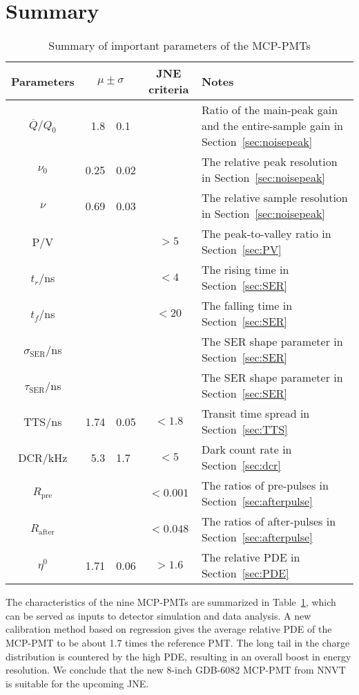 \section{Summary}
\label{Summary}
\begin{table}
    \centering
    \caption{Summary of important parameters of the MCP-PMTs}
    \label{tab:summary}
    \begin{tabularx}{\textwidth}{c|r @{$\pm$} l |c|X}
        \hline
        Parameters&\multicolumn{2}{c}{$\mu\pm\sigma$}\vline&JNE criteria&Notes\\
        \hline
        $\overline{Q}/Q_0$&1.8&0.1&&Ratio of the main-peak gain and the entire-sample gain in Section~\ref{sec:noisepeak}\\
        $\nu_0$&0.25&0.02&&The relative peak resolution in Section~\ref{sec:noisepeak}\\
        $\nu$&0.69&0.03&&The relative sample resolution in Section~\ref{sec:noisepeak}\\
        P/V&&&$>5$&The peak-to-valley ratio in Section~\ref{sec:PV}\\
        $t_r$/ns&&&$<4$&The rising time in Section~\ref{sec:SER}\\
        $t_f$/ns&&&$<20$&The falling time in Section~\ref{sec:SER}\\
        $\sigma_{\mathrm{SER}}$/ns&&&&The SER shape parameter in Section~\ref{sec:SER}\\
        $\tau_{\mathrm{SER}}$/ns&&&&The SER shape parameter in Section~\ref{sec:SER}\\
        TTS/ns&1.74&0.05&$<1.8$&Transit time spread in Section~\ref{sec:TTS}\\
        DCR/kHz&5.3&1.7&$<5$&Dark count rate in Section~\ref{sec:dcr}\\
        $R_{\mathrm{pre}}$&&&$<0.001$&The ratios of pre-pulses in Section~\ref{sec:afterpulse}\\
        $R_{\mathrm{after}}$&&&$<0.048$&The ratios of after-pulses in Section~\ref{sec:afterpulse}\\
        $\eta^0$&1.71&0.06&$>1.6$&The relative PDE in Section~\ref{sec:PDE}\\
        \hline
    \end{tabularx}
\end{table}

The characteristics of the nine MCP-PMTs are summarized in Table~\ref{tab:summary}, which can be served as inputs to detector simulation and data analysis. A new calibration method based on regression gives the average relative PDE of the MCP-PMT to be about 1.7 times the reference PMT. The long tail in the charge distribution is countered by the high PDE, resulting in an overall boost in energy resolution. We conclude that the new 8-inch GDB-6082 MCP-PMT from NNVT is suitable for the upcoming JNE.